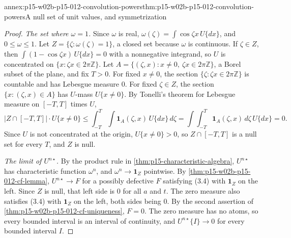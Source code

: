 \begin{annexitem}{annex:p15-w02b-p15-012-convolution-powers}{thm:p15-w02b-p15-012-convolution-powers}{A null set of unit values, and symmetrization}
\begin{proof}
\emph{The set where \(\omega=1\).} Since \(\omega\) is real,
\(\omega(\zeta)=\int\cos\zeta x\,U\{dx\}\), and \(0\leq\omega\leq1\). Let
\(Z=\{\zeta:\omega(\zeta)=1\}\), a closed set because \(\omega\) is
continuous. If \(\zeta\in Z\), then \(\int(1-\cos\zeta x)\,U\{dx\}=0\) with a
nonnegative integrand, so \(U\) is concentrated on
\(\{x:\zeta x\in2\pi\mathbb Z\}\). Let
\(A=\{(\zeta,x):x\neq0,\ \zeta x\in2\pi\mathbb Z\}\), a Borel subset of the
plane, and fix \(T>0\). For fixed \(x\neq0\), the section
\(\{\zeta:\zeta x\in2\pi\mathbb Z\}\) is countable and has Lebesgue measure
\(0\). For fixed \(\zeta\in Z\), the section \(\{x:(\zeta,x)\in A\}\) has
\(U\)-mass \(U\{x\neq0\}\). By Tonelli's theorem for Lebesgue measure on
\([-T,T]\) times \(U\),
\[
 \bigl|Z\cap[-T,T]\bigr|\cdot U\{x\neq0\}
   \leq\int_{-T}^T\!\!\int\mathbf 1_A(\zeta,x)\,U\{dx\}\,d\zeta
   =\int\!\!\int_{-T}^T\mathbf 1_A(\zeta,x)\,d\zeta\,U\{dx\}=0 .
\]
Since \(U\) is not concentrated at the origin, \(U\{x\neq0\}>0\), so
\(Z\cap[-T,T]\) is a null set for every \(T\), and \(Z\) is null.

\emph{The limit of \(U^{n\star}\).} By the product rule in
\cref{thm:p15-characteristic-algebra}, \(U^{n\star}\) has characteristic
function \(\omega^n\), and \(\omega^n\to\mathbf 1_Z\) pointwise. By
\cref{thm:p15-w02b-p15-012-cf-lemma}, \(U^{n\star}\to F\) for a possibly
defective \(F\) satisfying (3.4) with \(\mathbf 1_Z\) on the left. Since \(Z\)
is null, that left side is \(0\) for all \(a\) and \(t\). The zero measure
also satisfies (3.4) with \(\mathbf 1_Z\) on the left, both sides being
\(0\). By the second assertion of
\cref{thm:p15-w02b-p15-012-cf-uniqueness}, \(F=0\). The zero measure has no
atoms, so every bounded interval is an interval of continuity, and
\(U^{n\star}\{I\}\to0\) for every bounded interval \(I\).


\end{proof}
\end{annexitem}
